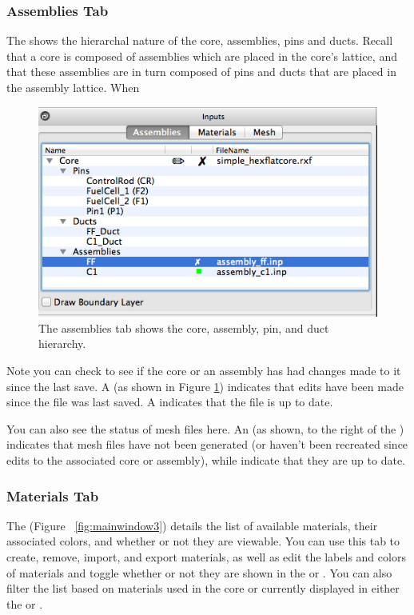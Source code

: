 \subsubsection{Assemblies Tab}
The  shows the hierarchal nature of the core, assemblies, pins and ducts.  Recall that a core is composed of assemblies which are placed in the core's lattice, and that these assemblies are in turn composed of pins and ducts that are placed in the assembly lattice.  When 

\begin{figure}[H]
	\begin{center}
		\includegraphics[width=0.5\linewidth]{Images/assemblies-tab.png}
		\caption{The assemblies tab shows the core, assembly, pin, and duct hierarchy.}
		\label{fig:mainwindow2}
	\end{center}
\end{figure}

Note you can check to see if the core or an assembly has had changes made to it since the last save.  A  (as shown in Figure \ref{fig:mainwindow2}) indicates that edits have been made since the file was last saved.  A  indicates that the file is up to date.

You can also see the status of mesh files here.  An  (as shown, to the right of the ) indicates that mesh files have not been generated (or haven't been recreated since edits to the associated core or assembly), while  indicate that they are up to date.

\subsubsection{Materials Tab}
The  (Figure ~\ref{fig:mainwindow3}) details the list of available materials, their associated colors, and whether or not they are viewable.  You can use this tab to create, remove, import, and export materials, as well as edit the labels and colors of materials and toggle whether or not they are shown in the  or .  You can also filter the list based on materials used in the core or currently displayed in either the  or .

